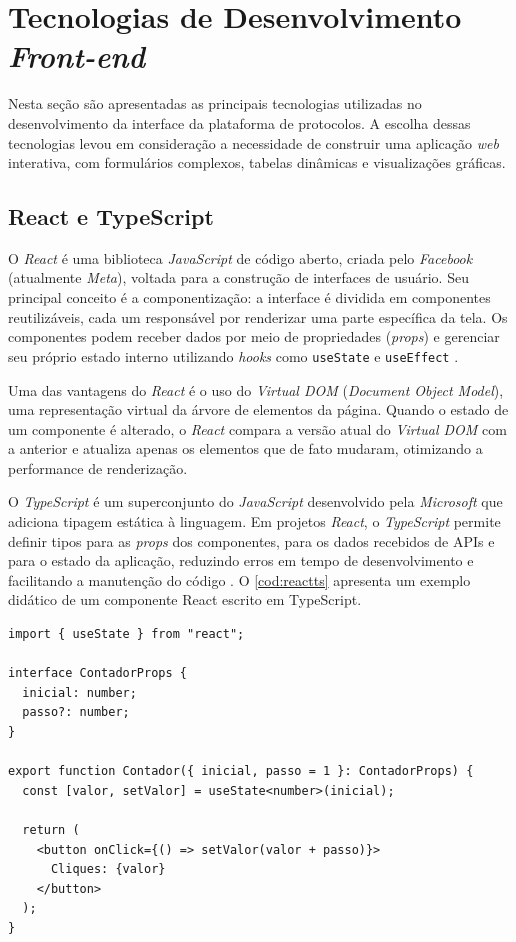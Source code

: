 \section{Tecnologias de Desenvolvimento \textit{Front-end}}

Nesta seção são apresentadas as principais tecnologias utilizadas no desenvolvimento da interface da plataforma de protocolos. A escolha dessas tecnologias levou em consideração a necessidade de construir uma aplicação \textit{web} interativa, com formulários complexos, tabelas dinâmicas e visualizações gráficas.

\subsection{React e TypeScript}

O \textit{React} é uma biblioteca \textit{JavaScript} de código aberto, criada pelo \textit{Facebook} (atualmente \textit{Meta}), voltada para a construção de interfaces de usuário. Seu principal conceito é a componentização: a interface é dividida em componentes reutilizáveis, cada um responsável por renderizar uma parte específica da tela. Os componentes podem receber dados por meio de propriedades (\textit{props}) e gerenciar seu próprio estado interno utilizando \textit{hooks} como \texttt{useState} e \texttt{useEffect} \cite{React2024}.

Uma das vantagens do \textit{React} é o uso do \textit{Virtual DOM} (\textit{Document Object Model}), uma representação virtual da árvore de elementos da página. Quando o estado de um componente é alterado, o \textit{React} compara a versão atual do \textit{Virtual DOM} com a anterior e atualiza apenas os elementos que de fato mudaram, otimizando a performance de renderização.

O \textit{TypeScript} é um superconjunto do \textit{JavaScript} desenvolvido pela \textit{Microsoft} que adiciona tipagem estática à linguagem. Em projetos \textit{React}, o \textit{TypeScript} permite definir tipos para as \textit{props} dos componentes, para os dados recebidos de APIs e para o estado da aplicação, reduzindo erros em tempo de desenvolvimento e facilitando a manutenção do código \cite{TypeScript2024}. O \autoref{cod:reactts} apresenta um exemplo didático de um componente React escrito em TypeScript.

\begin{lstlisting}[caption={Exemplo didático de um componente \textit{React} com \textit{TypeScript}.}, label={cod:reactts}]
import { useState } from "react";

interface ContadorProps {
  inicial: number;
  passo?: number;
}

export function Contador({ inicial, passo = 1 }: ContadorProps) {
  const [valor, setValor] = useState<number>(inicial);

  return (
    <button onClick={() => setValor(valor + passo)}>
      Cliques: {valor}
    </button>
  );
}
\end{lstlisting}

